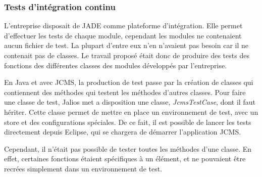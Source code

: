 \documentclass[12pt,a4paper]{article}
\begin{document}
\subsubsection{Tests d'intégration continu}
L'entreprise disposait de \gls{JADE} comme plateforme d'intégration. Elle permet d'effectuer les tests de chaque module, cependant les modules ne contenaient aucun fichier de test. La plupart d'entre eux n'en n'avaient pas besoin car il ne contenait pas de classes. Le travail proposé était donc de produire des tests des fonctions des différentes classes des modules développés par l'entreprise.\par
En Java et avec \gls{JCMS}, la production de test passe par la création de classes qui contiennent des méthodes qui testent les méthodes d'autres classes. Pour faire une classe de test, Jalios met a disposition une classe, \textit{JcmsTestCase}, dont il faut hériter. Cette classe permet de mettre en place un environnement de test, avec un store et des configurations spéciales. De ce fait, il est possible de lancer les tests directement depuis Eclipse, qui se chargera de démarrer l'application \gls{JCMS}.\par
Cependant, il n'était pas possible de tester toutes les méthodes d'une classe. En effet, certaines fonctions étaient spécifiques à un élément, et ne pouvaient être recrées simplement dans un environnement de test.\par

\newpage
\end{document}
